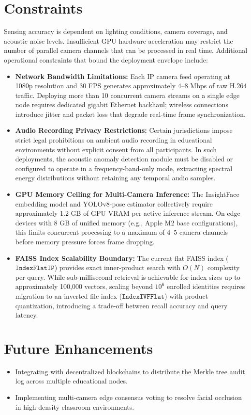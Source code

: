 \documentclass[12pt,a4paper,oneside]{report}
\begin{document}
\section{Constraints}
Sensing accuracy is dependent on lighting conditions, camera coverage, and acoustic noise levels. Insufficient GPU hardware acceleration may restrict the number of parallel camera channels that can be processed in real time. Additional operational constraints that bound the deployment envelope include:
\begin{itemize}
    \item \textbf{Network Bandwidth Limitations:} Each IP camera feed operating at 1080p resolution and 30 FPS generates approximately 4--8 Mbps of raw H.264 traffic. Deploying more than 10 concurrent camera streams on a single edge node requires dedicated gigabit Ethernet backhaul; wireless connections introduce jitter and packet loss that degrade real-time frame synchronization.
    \item \textbf{Audio Recording Privacy Restrictions:} Certain jurisdictions impose strict legal prohibitions on ambient audio recording in educational environments without explicit consent from all participants. In such deployments, the acoustic anomaly detection module must be disabled or configured to operate in a frequency-band-only mode, extracting spectral energy distributions without retaining any temporal audio samples.
    \item \textbf{GPU Memory Ceiling for Multi-Camera Inference:} The InsightFace embedding model and YOLOv8-pose estimator collectively require approximately 1.2 GB of GPU VRAM per active inference stream. On edge devices with 8 GB of unified memory (e.g., Apple M2 base configurations), this limits concurrent processing to a maximum of 4--5 camera channels before memory pressure forces frame dropping.
    \item \textbf{FAISS Index Scalability Boundary:} The current flat FAISS index ($\texttt{IndexFlatIP}$) provides exact inner-product search with $O(N)$ complexity per query. While sub-millisecond retrieval is achievable for index sizes up to approximately 100,000 vectors, scaling beyond $10^6$ enrolled identities requires migration to an inverted file index ($\texttt{IndexIVFFlat}$) with product quantization, introducing a trade-off between recall accuracy and query latency.
\end{itemize}

\section{Future Enhancements}
\begin{itemize}
    \item Integrating with decentralized blockchains to distribute the Merkle tree audit log across multiple educational nodes.
    \item Implementing multi-camera edge consensus voting to resolve facial occlusion in high-density classroom environments.
\end{itemize}
\end{document}
